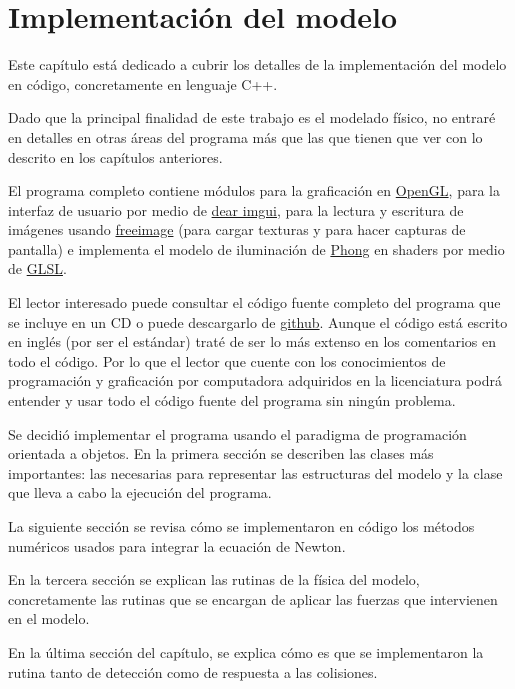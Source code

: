 \chapter{Implementación del modelo}
Este capítulo está dedicado a cubrir los detalles de la implementación del modelo en código, concretamente en lenguaje C++.

Dado que la principal finalidad de este trabajo es el modelado físico, no entraré en detalles en otras áreas del programa más que las que tienen que ver con lo descrito en los capítulos anteriores.

El programa completo contiene módulos para la graficación en \href{http://www.opengl.org/}{OpenGL}, para la interfaz de usuario por medio de \href{https://github.com/ocornut/imgui}{dear imgui}, para la lectura y escritura de imágenes usando \href{http://freeimage.sourceforge.io/}{freeimage} (para cargar texturas y para hacer capturas de pantalla) e implementa el modelo de iluminación de \href{http://en.wikipedia.org/wiki/Phong_reflection_model}{Phong} en shaders por medio de \href{http://www.khronos.org/opengl/wiki/OpenGL_Shading_Language}{GLSL}.

El lector interesado puede consultar el código fuente completo del programa que se incluye en un CD o puede descargarlo de \href{http://github.com/nemediano}{github}.
Aunque el código está escrito en inglés (por ser el estándar) traté de ser lo más extenso en los comentarios en todo el código.
Por lo que el lector que cuente con los conocimientos de programación y graficación por computadora adquiridos en la licenciatura podrá entender y usar todo el código fuente del programa sin ningún problema.

Se decidió implementar el programa usando el paradigma de programación orientada a objetos. 
En la primera sección se describen las clases más importantes: las necesarias para representar las estructuras del modelo y la clase que lleva a cabo la ejecución del programa.

La siguiente sección se revisa cómo se implementaron en código los métodos numéricos usados para integrar la ecuación de Newton.

En la tercera sección se explican las rutinas de la física del modelo, concretamente las rutinas que se encargan de aplicar las fuerzas que intervienen en el modelo.

En la última sección del capítulo, se explica cómo es que se implementaron la rutina tanto de detección como de respuesta a las colisiones.

